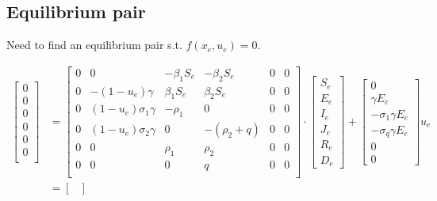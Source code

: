 \documentclass[fleqn]{article}
\begin{document}
\subsection*{Equilibrium pair}
Need to find an equilibrium pair s.t. $f(x_e, u_e) = 0$.

\begin{equation*}
    \begin{split}
        \begin{bmatrix}
            0 \\
            0 \\
            0 \\
            0 \\
            0 \\
            0 \\
        \end{bmatrix} & = \begin{bmatrix}
            0 & 0 & {-\beta_1 S_e} & {-\beta_2 S_e} & 0 & 0 \\
            0 & -(1 - u_e) \gamma & {\beta_1 S_e} & {\beta_2 S_e} & 0 & 0 \\
            0 & (1 - u_e) \sigma_1 \gamma & -\rho_1 & 0 & 0 & 0 \\
            0 & (1 - u_e) \sigma_2 \gamma & 0 & -(\rho_2 + q) & 0 & 0 \\
            0 & 0 & \rho_1 & \rho_2 & 0 & 0 \\
            0 & 0 & 0 & q & 0 & 0 \\
        \end{bmatrix} \cdot \begin{bmatrix}
            S_e \\
            E_e \\
            I_e \\
            J_e \\
            R_e \\
            D_e
        \end{bmatrix} + \begin{bmatrix}
            0 \\
            \gamma E_e \\
            -\sigma_1 \gamma E_e \\
            -\sigma_q \gamma E_e \\
            0 \\
            0
        \end{bmatrix} u_e \\
        & = \begin{bmatrix}

\end{bmatrix}
\end{split}
\end{equation*}
\end{document}

